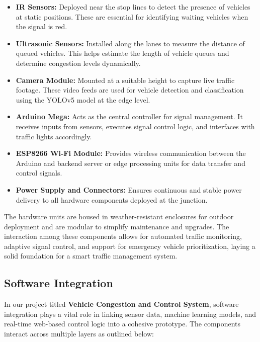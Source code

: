 \begin{itemize}
    \item \textbf{IR Sensors:} Deployed near the stop lines to detect the presence of vehicles at static positions. These are essential for identifying waiting vehicles when the signal is red.
    
    \item \textbf{Ultrasonic Sensors:} Installed along the lanes to measure the distance of queued vehicles. This helps estimate the length of vehicle queues and determine congestion levels dynamically.
    
    \item \textbf{Camera Module:} Mounted at a suitable height to capture live traffic footage. These video feeds are used for vehicle detection and classification using the YOLOv5 model at the edge level.
    
    \item \textbf{Arduino Mega:} Acts as the central controller for signal management. It receives inputs from sensors, executes signal control logic, and interfaces with traffic lights accordingly.
    
    \item \textbf{ESP8266 Wi-Fi Module:} Provides wireless communication between the Arduino and backend server or edge processing units for data transfer and control signals.
    
    \item \textbf{Power Supply and Connectors:} Ensures continuous and stable power delivery to all hardware components deployed at the junction.
\end{itemize}

\vspace{0.3cm}

The hardware units are housed in weather-resistant enclosures for outdoor deployment and are modular to simplify maintenance and upgrades. The interaction among these components allows for automated traffic monitoring, adaptive signal control, and support for emergency vehicle prioritization, laying a solid foundation for a smart traffic management system.


\subsection{Software Integration}

In our project titled \textbf{Vehicle Congestion and Control System}, software integration plays a vital role in linking sensor data, machine learning models, and real-time web-based control logic into a cohesive prototype. The components interact across multiple layers as outlined below:

